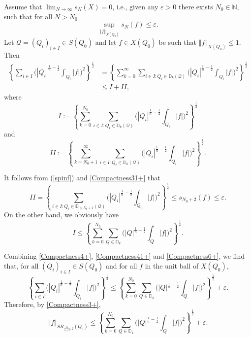 \documentclass[11pt, a4paper,leqno]{amsart}
\theoremstyle{plain}
\numberwithin{equation}{section}
\theoremstyle{definition}
\theoremstyle{remark}
\begin{document}
Assume that $\lim_{N \to \infty} s_N(X) =0$, i.e., given any $\varepsilon>0$ there exists $N_{0}\in\mathbb{N}$,
such that for all $N>N_{0}$
\begin{equation}
\sup_{\left\Vert f\right\Vert _{X(Q_{0})}} s_{N}(f)\leq\varepsilon.\label{Compactness31+}%
\end{equation}
Let $\mathcal{Q}=(Q_{i})_{i\in I}\in S(Q_{0})$ and let $f\in X(Q_{0})$ be such
that $\left\Vert f\right\Vert _{X(Q_{0})}\leq1.$ Then
\begin{align}
\left\{  \sum_{i\in I}\bigg(|Q_{i}|^{\frac{1}{n}-\frac{1}{2}}\int_{Q_{i}%
}|f|\bigg)^{2}\right\}  ^{\frac{1}{2}} &  =\left\{  \sum_{k=0}^{\infty}%
\sum_{i\in I:Q_{i}\in\mathbb{D}_{k}(\mathcal{Q})}\bigg(|Q_{i}|^{\frac{1}%
{n}-\frac{1}{2}}\int_{Q_{i}}|f|\bigg)^{2}\right\}  ^{\frac{1}{2}}\nonumber\\
&  \leq I+II,\label{Compactness4+}%
\end{align}
where
\[
I:=\left\{  \sum_{k=0}^{N_{0}}\sum_{i\in I:Q_{i}\in\mathbb{D}_{k}%
(\mathcal{Q})}\bigg(|Q_{i}|^{\frac{1}{n}-\frac{1}{2}}\int_{Q_{i}}%
|f|\bigg)^{2}\right\}  ^{\frac{1}{2}}%
\]
and
\[
II:=\left\{  \sum_{k=N_{0}+1}^{\infty}\sum_{i\in I:Q_{i}\in\mathbb{D}%
_{k}(\mathcal{Q})}\bigg(|Q_{i}|^{\frac{1}{n}-\frac{1}{2}}\int_{Q_{i}%
}|f|\bigg)^{2}\right\}  ^{\frac{1}{2}}.
\]


It follows from (\ref{spinf}) and \eqref{Compactness31+} that
\begin{equation}
II = \left\{ \sum_{i\in I:Q_{i}\in\mathbb{D}%
_{\leq N_0 +1}(\mathcal{Q})}\bigg(|Q_{i}|^{\frac{1}{n}-\frac{1}{2}}\int_{Q_{i}%
}|f|\bigg)^{2}\right\}  ^{\frac{1}{2}}  \leq s_{N_0 + 2}(f) \leq\varepsilon.\label{Compactness41+}%
\end{equation}
On the other hand, we obviously have
\begin{equation}
I\leq\left\{  \sum_{k=0}^{N_{0}}\sum_{Q\in\mathbb{D}_{k}}%
\bigg(|Q|^{\frac{1}{n}-\frac{1}{2}}\int_{Q}|f|\bigg)^{2}\right\}  ^{\frac
{1}{2}}.\label{Compactness6+}%
\end{equation}


Combining \eqref{Compactness4+}, \eqref{Compactness41+} and
\eqref{Compactness6+}, we find that, for all $(Q_{i})_{i\in I}\in S(Q_{0})$
and for all $f$ in the unit ball of $X(Q_{0}),$%
\[
\left\{  \sum_{i\in I}\bigg(|Q_{i}|^{\frac{1}{n}-\frac{1}{2}}\int_{Q_{i}%
}|f|\bigg)^{2}\right\}  ^{\frac{1}{2}}\leq\left\{  \sum_{k=0}^{N_{0}}%
\sum_{Q\in\mathbb{D}_{k}}\bigg(|Q|^{\frac{1}{n}-\frac{1}{2}}\int%
_{Q}|f|\bigg)^{2}\right\}  ^{\frac{1}{2}}+\varepsilon.
\]
Therefore, by \eqref{Compactness3+},
\begin{equation}
\Vert f\Vert_{SR_{\frac{2n}{n+2},2}(Q_{0})}\leq\left\{  \sum_{k=0}^{N_{0}}%
\sum_{Q\in\mathbb{D}_{k}}\bigg(|Q|^{\frac{1}{n}-\frac{1}{2}}\int%
_{Q}|f|\bigg)^{2}\right\}  ^{\frac{1}{2}}+\varepsilon.\label{Compactness7+}%
\end{equation}
\end{document}
